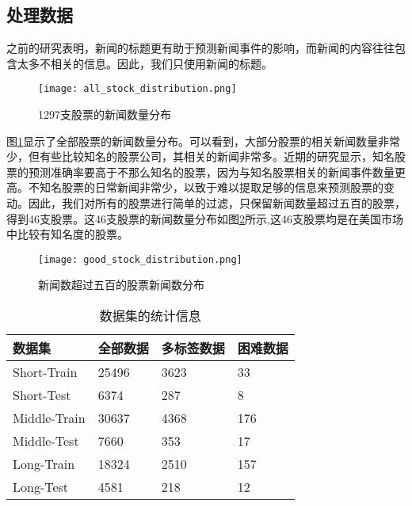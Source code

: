 \subsection{处理数据}

之前的研究表明，新闻的标题更有助于预测新闻事件的影响，而新闻的内容往往包含太多不相关的信息。因此，我们只使用新闻的标题\cite{ding2014using}。
\begin{figure}[ht]
	\centering
	\texttt{[image: all\_stock\_distribution.png]}
	\caption{1297支股票的新闻数量分布}
	\label{fig:all-stock-distribution}
\end{figure}
图\ref{fig:all-stock-distribution}显示了全部股票的新闻数量分布。可以看到，大部分股票的相关新闻数量非常少，但有些比较知名的股票公司，其相关的新闻非常多。近期的研究\cite{ding2014using}显示，知名股票的预测准确率要高于不那么知名的股票，因为与知名股票相关的新闻事件数量更高。不知名股票的日常新闻非常少，以致于难以提取足够的信息来预测股票的变动。因此，我们对所有的股票进行简单的过滤，只保留新闻数量超过五百的股票，得到46支股票。这46支股票的新闻数量分布如图\ref{fig:good_stock_distribution}所示,这46支股票均是在美国市场中比较有知名度的股票。

\begin{figure}[ht]
	\centering 
	\texttt{[image: good\_stock\_distribution.png]}
	\caption{新闻数超过五百的股票新闻数分布}
	\label{fig:good_stock_distribution}
\end{figure}

\begin{table}[ht]
	\centering 
	\begin{minipage}[t]{0.8\linewidth}
		\caption[]{数据集的统计信息}
		\label{tab:datasetstatistics}
		\begin{tabularx}{1\linewidth}{lXXX}
			\toprule[1.5pt]
			数据集 & 全部数据 & 多标签数据 & 困难数据\\ \midrule[1pt]
			Short-Train & 25496 & 3623 & 33 \\ 
            Short-Test & 6374 & 287 & 8 \\ 
            Middle-Train & 30637 & 4368 & 176 \\ 
            Middle-Test & 7660 & 353 & 17 \\ 
            Long-Train & 18324 & 2510 & 157 \\
			Long-Test & 4581 & 218 & 12 \\ 
			\bottomrule[1.5pt]
		\end{tabularx}
	\end{minipage}
\end{table}

